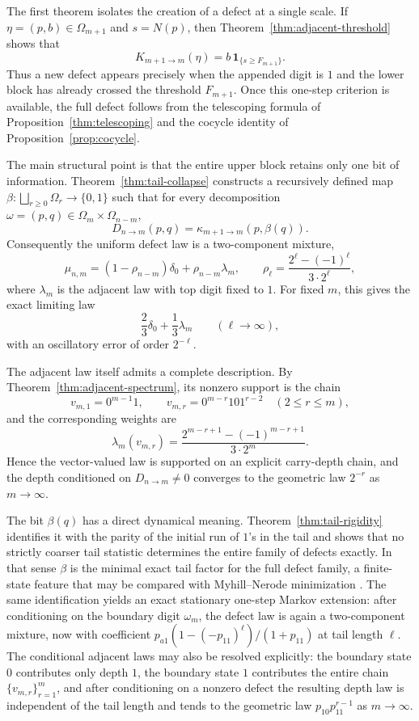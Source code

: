 \documentclass[11pt,reqno]{amsart}
\numberwithin{equation}{section}
\theoremstyle{plain}
\theoremstyle{definition}
\theoremstyle{remark}
\begin{document}
The first theorem isolates the creation of a defect at a single scale.  If
$\eta=(p,b)\in\Omega_{m+1}$ and $s=N(p)$, then
Theorem~\ref{thm:adjacent-threshold} shows that
\[
K_{m+1\to m}(\eta)=b\,\mathbf{1}_{\{s\ge F_{m+1}\}}.
\]
Thus a new defect appears precisely when the appended digit is $1$ and the
lower block has already crossed the threshold $F_{m+1}$.  Once this one-step
criterion is available, the full defect follows from the telescoping formula
of Proposition~\ref{thm:telescoping} and the cocycle identity of
Proposition~\ref{prop:cocycle}.

The main structural point is that the entire upper block retains only one bit
of information.  Theorem~\ref{thm:tail-collapse} constructs a recursively
defined map $\beta:\bigsqcup_{r\ge 0}\Omega_r\to\{0,1\}$ such that for every
decomposition $\omega=(p,q)\in\Omega_m\times\Omega_{n-m}$,
\[
D_{n\to m}(p,q)=\kappa_{m+1\to m}(p,\beta(q)).
\]
Consequently the uniform defect law is a two-component mixture,
\[
\mu_{n,m}=(1-\rho_{n-m})\delta_0+\rho_{n-m}\lambda_m,
\qquad
\rho_\ell=\frac{2^\ell-(-1)^\ell}{3\cdot 2^\ell},
\]
where $\lambda_m$ is the adjacent law with top digit fixed to $1$.  For fixed
$m$, this gives the exact limiting law
\[
\frac23\delta_0+\frac13\lambda_m
\qquad (\ell\to\infty),
\]
with an oscillatory error of order $2^{-\ell}$.

The adjacent law itself admits a complete description.  By
Theorem~\ref{thm:adjacent-spectrum}, its nonzero support is the chain
\[
v_{m,1}=0^{m-1}1,
\qquad
v_{m,r}=0^{m-r}10 1^{r-2}\quad (2\le r\le m),
\]
and the corresponding weights are
\[
\lambda_m(v_{m,r})
=
\frac{2^{m-r+1}-(-1)^{m-r+1}}{3\cdot 2^m}.
\]
Hence the vector-valued law is supported on an explicit carry-depth chain, and
the depth conditioned on $D_{n\to m}\neq 0$ converges to the geometric law
$2^{-r}$ as $m\to\infty$.

The bit $\beta(q)$ has a direct dynamical meaning.  Theorem~\ref{thm:tail-rigidity}
identifies it with the parity of the initial run of $1$'s in the tail and
shows that no strictly coarser tail statistic determines the entire family of
defects exactly.  In that sense $\beta$ is the minimal exact tail factor for
the full defect family, a finite-state feature that may be compared with
Myhill--Nerode minimization \cite{Myhill1957,Nerode1958}.  The same
identification yields an exact stationary one-step Markov extension: after
conditioning on the boundary digit $\omega_m$, the defect law is again a
two-component mixture, now with coefficient
$p_{a1}(1-(-p_{11})^\ell)/(1+p_{11})$ at tail length $\ell$.  The conditional
adjacent laws may also be resolved explicitly: the boundary state $0$
contributes only depth $1$, the boundary state $1$ contributes the entire chain
$\{v_{m,r}\}_{r=1}^m$, and after conditioning on a nonzero defect the resulting
depth law is independent of the tail length and tends to the geometric law
$p_{10}p_{11}^{r-1}$ as $m\to\infty$.
\end{document}
